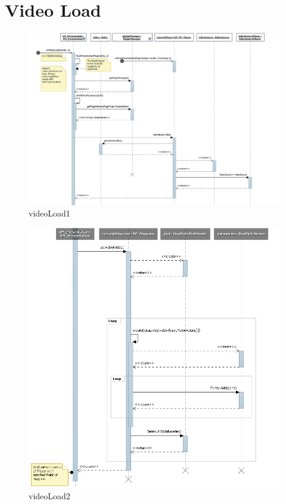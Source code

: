 \section{Video Load}
\begin{figure}[H]
\includegraphics[width=\linewidth]{bilder/Sequenzdiagramm/videoLoad1.png}
\caption{videoLoad1}
\end{figure}

\begin{figure}[H]
\includegraphics[width=\linewidth]{bilder/Sequenzdiagramm/videoLoad2.png}
\caption{videoLoad2}
\end{figure}


